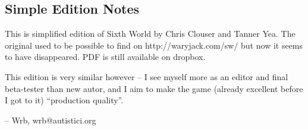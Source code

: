 \subsection{Simple Edition Notes}

This is simplified edition of Sixth World by Chris Clouser and Tanner Yea. The original used to be possible to find on http://waryjack.com/sw/ but now it seems to have disappeared. PDF is still available on dropbox.

This edition is very similar however – I see myself more as an editor and final beta-tester than new autor, and I aim to make the game (already excellent before I got to it) “production quality”.

– Wrb, wrb@autistici.org